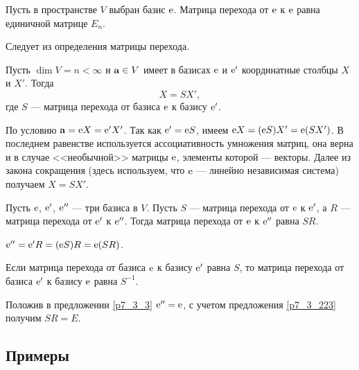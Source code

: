 \begin{predl}\label{p7_3_223}
Пусть в пространстве $V$ выбран базис $\mathrm{e}$. Матрица 
перехода от $\mathrm{e}$ к $\mathrm{e}$ равна единичной матрице $E_n$.
\end{predl}
\dok Следует из определения матрицы перехода.
\edok

\begin{theor}\label{t7_3_2}
Пусть $\dim V=n<\infty $ и $\mathbf{a}\in V$ имеет в базисах
$\mathrm{e}$ %
и
$\mathrm{e}'$ %
координатные столбцы
$X$ и $X'$. Тогда $$\boxed{X = SX '},$$ где $S$ --- матрица перехода от
базиса $\mathrm{e}$ к базису $\mathrm{e}'$.
\end{theor}
\dok
По условию $\mathbf{a} = \mathrm{e}X = \mathrm{e}'X'$.
Так как $\mathrm{e}' = \mathrm{e} S$, имеем
$\mathrm{e}X = (\mathrm{e}S) X' = \mathrm{e} (S X')$. В последнем равенстве используется 
ассоциативность умножения матриц, она верна и в случае <<необычной>> матрицы $\mathrm{e}$,
элементы которой --- векторы.
Далее из закона сокращения (здесь используем, что $\mathrm{e}$ --- линейно независимая система)
получаем $X=SX'$.
\edok

\begin{predl}\label{p7_3_3}
 Пусть $\mathrm{e}$, $\mathrm{e}'$, $\mathrm{e}''$ --- три базиса в $V$.
Пусть $S$ --- матрица перехода от $\mathrm{e}$ к $\mathrm{e}'$,
а $R$ --- матрица перехода от $\mathrm{e}'$ к $\mathrm{e}''$. Тогда
матрица перехода от $\mathrm{e}$ к $\mathrm{e}''$ равна $SR$.
\end{predl}
\dok
$\mathrm{e}''=\mathrm{e}'R = (\mathrm{e}S)R = \mathrm{e}(SR)$.
\edok

\otstup

\begin{sled} Если матрица перехода от базиса $\mathrm{e}$ к базису $\mathrm{e}'$ равна $S$, то 
 матрица перехода от базиса $\mathrm{e}'$ к базису $\mathrm{e}$ равна  $S^{-1}$.
\end{sled}
\dok Положив в предложении \ref{p7_3_3} $\mathrm{e}''=\mathrm{e}$, с учетом предложения \ref{p7_3_223}
получим $SR=E$.
\edok

\subsection{Примеры}


